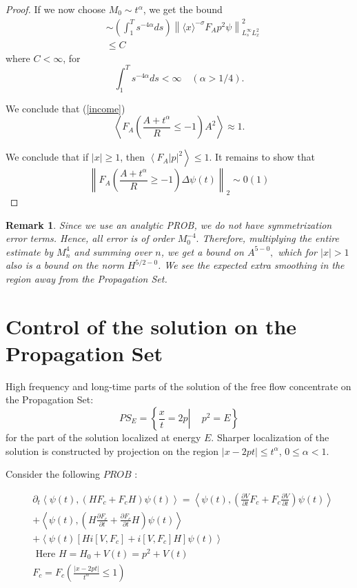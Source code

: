 \documentclass[11pt]{article}
\newtheorem{remark}[theorem]{Remark}
\begin{document}
\begin{proof}
 If we now choose $M_{0} \sim t^{\alpha}$, we get the bound
$$
\begin{aligned}
& \sim\left(\int_{1}^{T} s^{-4 \alpha} d s\right)\left\|\langle x\rangle^{-\sigma} F_{A} p^{2} \psi\right\|_{L_{s}^{\infty} L_{x}^{2}}^2 \\
& \leq C
\end{aligned}
$$
where $C<\infty$, for
$$
\int_{1}^{T} s^{-4 \alpha} d s<\infty \quad(\alpha>1 / 4) .
$$

We conclude that (\eqref{income})
$$
\left\langle F_{A}\left(\frac{A+t^{\alpha}}{R} \leq-1\right) A^{2}\right\rangle \approx 1 .
$$

We conclude that if $|x| \geq 1$, then $\left.\left.\left\langle F_{A}\right| p\right|^{2}\right\rangle \leq 1$.
It remains to show that
$$
\left\|F_{A}\left(\frac{A+t^{\alpha}}{R} \geqslant-1\right) \Delta \psi(t)\right\|_{2} \sim 0(1)
$$
\end{proof}
\begin{remark}
Since we use an analytic PROB, we do not have symmetrization error terms. Hence, all error is of order $M_0^{-4}.$
Therefore, multiplying the entire estimate by $M_n^4$ and summing over $n$, we get a bound on $A^{5-0},$ which for $|x|>1$ also is a bound on the norm $H^{5/2-0}$. We see the expected extra smoothing in the region away from the Propagation Set.
\end{remark}
\section{Control of the solution on the Propagation Set}

High frequency and long-time parts of the solution of the free flow concentrate on the Propagation Set:
$$
P S_{E}=\left\{\left.\frac{x}{t}=2 p \right\rvert\, \quad p^{2}=E\right\}
$$
for the part of the solution localized at energy $E.$
Sharper localization of the solution is constructed by projection on the region $|x-2 p t| \leq t^{\alpha}$, $0 \leqslant \alpha<1$.


Consider the following $P R O B$ :

\begin{align}\label{HF}
& \partial_{t}\left\langle\psi(t),\left(H F_{c}+F_{c} H\right) \psi(t)\right\rangle=\left\langle\psi(t),\left(\frac{\partial V}{\partial t} F_c+F_{c} \frac{\partial V}{\partial t}\right) \psi(t)\right\rangle \\
& +\left\langle\psi(t),\left(H \frac{\partial F_{c}}{\partial t}+\frac{\partial F_{c}}{\partial t} H\right) \psi(t)\right\rangle \\
& +\left\langle\psi(t)\left[H i\left[V, F_{c}\right]+i\left[V, F_{c}\right] H\right] \psi(t)\right\rangle \\
& \text { Here } H=H_{0}+V(t)=p^{2}+V(t) \\
& F_{c}=F_{c}\left(\frac{|x-2 p t|}{t^{\alpha}} \leq 1\right)
\end{align}
\end{document}
